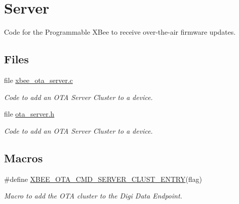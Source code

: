 \hypertarget{group__xbee__ota__server}{}\section{Server}
\label{group__xbee__ota__server}


\begin{DoxyVerb}     Code for the Programmable XBee to receive over-the-air firmware
     updates.\end{DoxyVerb}
  


\subsection*{Files}
\begin{DoxyCompactItemize}
\item 
file \hyperlink{xbee__ota__server_8c}{xbee\+\_\+ota\+\_\+server.\+c}
\begin{DoxyCompactList}\small\item\em Code to add an O\+TA Server Cluster to a device. \end{DoxyCompactList}\item 
file \hyperlink{ota__server_8h}{ota\+\_\+server.\+h}
\begin{DoxyCompactList}\small\item\em Code to add an O\+TA Server Cluster to a device. \end{DoxyCompactList}\end{DoxyCompactItemize}
\subsection*{Macros}
\begin{DoxyCompactItemize}
\item 
\#define \hyperlink{group__xbee__ota__server_gacdc427d19ad192bd817194a74a8d7b08}{X\+B\+E\+E\+\_\+\+O\+T\+A\+\_\+\+C\+M\+D\+\_\+\+S\+E\+R\+V\+E\+R\+\_\+\+C\+L\+U\+S\+T\+\_\+\+E\+N\+T\+RY}(flag)
\begin{DoxyCompactList}\small\item\em Macro to add the O\+TA cluster to the Digi Data Endpoint. \end{DoxyCompactList}\end{DoxyCompactItemize}
